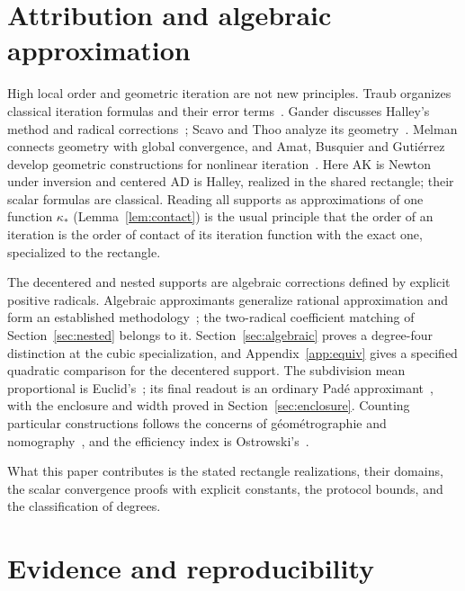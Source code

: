 \section{Attribution and algebraic approximation}\label{sec:attribution}

High local order and geometric iteration are not new principles. Traub organizes classical iteration
formulas and their error terms~\cite{traub61,traub64}. Gander discusses Halley's method and radical
corrections~\cite{gander}; Scavo and Thoo analyze its geometry~\cite{scavo}. Melman connects geometry
with global convergence, and Amat, Busquier and Guti\'errez develop geometric constructions for
nonlinear iteration~\cite{melman,amat}. Here AK is Newton under inversion and centered AD is Halley,
realized in the shared rectangle; their scalar formulas are classical. Reading all supports as
approximations of one function $\kappa_*$ (Lemma~\ref{lem:contact}) is the usual principle that the
order of an iteration is the order of contact of its iteration function with the exact one, specialized
to the rectangle.

The decentered and nested supports are algebraic corrections defined by explicit positive radicals.
Algebraic approximants generalize rational approximation and form an established
methodology~\cite{sergeev,shafer}; the two-radical coefficient matching of Section~\ref{sec:nested}
belongs to it. Section~\ref{sec:algebraic} proves a degree-four distinction at the cubic
specialization, and Appendix~\ref{app:equiv} gives a specified quadratic comparison for the decentered
support. The subdivision mean proportional is Euclid's~\cite{euclid}; its final readout is an ordinary
Pad\'e approximant~\cite{dlmf,baker}, with the enclosure and width proved in
Section~\ref{sec:enclosure}. Counting particular constructions follows the concerns of
g\'eom\'etrographie and nomography~\cite{lemoine,ocagne}, and the efficiency index is
Ostrowski's~\cite{ostrowski}.

What this paper contributes is the stated rectangle realizations, their domains, the scalar convergence
proofs with explicit constants, the protocol bounds, and the classification of degrees.

\section{Evidence and reproducibility}\label{sec:evidence}


